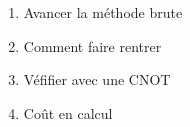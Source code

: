 \documentclass[letterpaper,12pt,oneside,final]{article}
\begin{document}
\begin{enumerate}
    \item Avancer la méthode brute
    \item Comment faire rentrer 
    \item Véfifier avec une CNOT
    \item Coût en calcul 
\end{enumerate}
\end{document}
